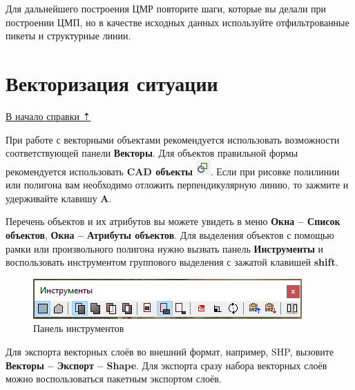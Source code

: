 \documentclass[
  12pt,
]{book}
\begin{document}
Для дальнейшего построения ЦМР повторите шаги, которые вы делали при построении ЦМП, но в качестве исходных данных используйте отфильтрованные пикеты и структурные линии.

\hypertarget{photomod_DEM-vector}{%
\section{Векторизация ситуации}\label{photomod_DEM-vector}}

\protect\hyperlink{photomod_DEM}{В начало справки ⇡}

При работе с векторными объектами рекомендуется использовать возможности соответствующей панели \textbf{Векторы}. Для объектов правильной формы рекомендуется использовать \textbf{CAD объекты} \includegraphics{images/Ref16/CAD.png}. Если при рисовке полилинии или полигона вам необходимо отложить перпендикулярную линию, то зажмите и удерживайте клавишу \textbf{A}.

Перечень объектов и их атрибутов вы можете увидеть в меню \textbf{Окна -- Список объектов}, \textbf{Окна -- Атрибуты объектов}. Для выделения объектов с помощью рамки или произвольного полигона нужно вызвать панель \textbf{Инструменты} и воспользовать инструментом группового выделения с зажатой клавишей \textbf{shift}.

\begin{figure}
\centering
\includegraphics{images/Ref16/Instruments.png}
\caption{Панель инструментов}
\end{figure}

Для экспорта векторных слоёв во внешний формат, например, SHP, вызовите \textbf{Векторы -- Экспорт -- Shape}. Для экспорта сразу набора векторных слоёв можно воспользоваться пакетным экспортом слоёв.
\end{document}
